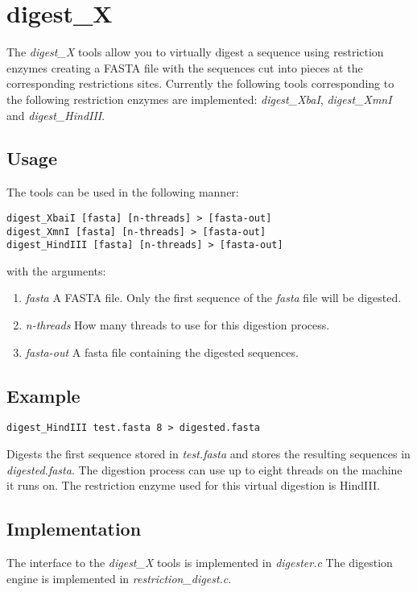 \section{digest\_X}

The \emph{digest\_X} tools allow you to virtually digest a sequence
using restriction enzymes creating a FASTA file with the sequences
cut into pieces at the corresponding restrictions sites.
Currently the following tools corresponding to the following
restriction enzymes are implemented: \emph{digest\_XbaI}, \emph{digest\_XmnI}
and \emph{digest\_HindIII}. 

\subsection{Usage}
The tools can be used in the following manner:
\begin{lstlisting}
digest_XbaiI [fasta] [n-threads] > [fasta-out]
digest_XmnI [fasta] [n-threads] > [fasta-out]
digest_HindIII [fasta] [n-threads] > [fasta-out]
\end{lstlisting}
with the arguments:
\begin{enumerate}
\item \emph{fasta} A FASTA file. Only the first sequence of the \emph{fasta}
  file will be digested.
\item \emph{n-threads} How many threads to use for this digestion process.
\item \emph{fasta-out} A fasta file containing the digested sequences.
\end{enumerate}

\subsection{Example}
\begin{lstlisting}
digest_HindIII test.fasta 8 > digested.fasta
\end{lstlisting}
Digests the first sequence stored in \emph{test.fasta} and stores the resulting
sequences in \emph{digested.fasta}. The digestion process can use up to eight
threads on the machine it runs on. The restriction enzyme used for this
virtual digestion is HindIII. 

\subsection{Implementation}
The interface to the \emph{digest\_X} tools is implemented in \emph{digester.c}
The digestion engine is implemented in \emph{restriction\_digest.c}. 
